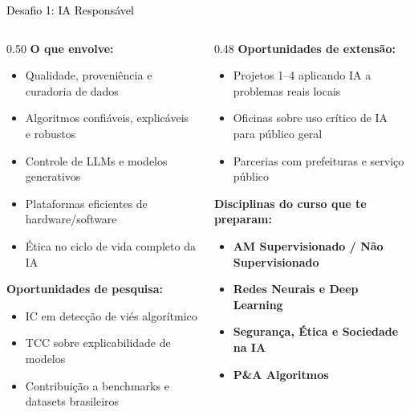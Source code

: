 \documentclass[aspectratio=169]{beamer}
\newcommand{\impt}[1]{\textcolor{morange}{\textbf{#1}}}
\newcommand{\ntc}[1]{\textcolor{mblue}{#1}}
\newcommand{\cc}[1]{\textcolor{mcc}{\textbf{#1}}}
\newcommand{\ia}[1]{\textcolor{mia}{\textbf{#1}}}
\begin{document}
\begin{frame}{\colorbox{dsfai}{\textcolor{black}{Desafio 1: IA Responsável}}}
  \footnotesize
  \begin{columns}[T]
    \begin{column}{0.50\textwidth}
      \textbf{O que envolve:}
      \begin{itemize}\setlength\itemsep{3pt}
        \item Qualidade, proveniência e curadoria de dados
        \item Algoritmos confiáveis, explicáveis e robustos
        \item Controle de LLMs e modelos generativos
        \item Plataformas eficientes de hardware/software
        \item Ética no ciclo de vida completo da IA
      \end{itemize}
      \vspace{0.2cm}
      \textbf{Oportunidades de \impt{pesquisa}:}
      \begin{itemize}\setlength\itemsep{2pt}
        \item IC em detecção de viés algorítmico
        \item TCC sobre explicabilidade de modelos
        \item Contribuição a benchmarks e datasets brasileiros
      \end{itemize}
    \end{column}
    \begin{column}{0.48\textwidth}
      \textbf{Oportunidades de \ntc{extensão}:}
      \begin{itemize}\setlength\itemsep{2pt}
        \item Projetos 1--4 aplicando IA a problemas reais locais
        \item Oficinas sobre uso crítico de IA para público geral
        \item Parcerias com prefeituras e serviço público
      \end{itemize}
      \vspace{0.2cm}
      \textbf{Disciplinas do curso que te preparam:}
      \begin{itemize}\setlength\itemsep{2pt}
        \item \ia{AM Supervisionado / Não Supervisionado}
        \item \ia{Redes Neurais e Deep Learning}
        \item \ia{Segurança, Ética e Sociedade na IA}
        \item \cc{P\&A Algoritmos}
      \end{itemize}
    \end{column}
  \end{columns}
\end{frame}
\end{document}
